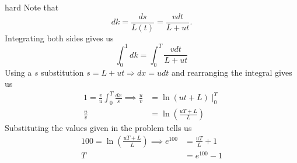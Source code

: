 \begin{solution}{hard}
Note that
\[dk = \frac {ds}{L(t)} = \frac {vdt}{L+ut}.\]
Integrating both sides gives us
\[\int_{0}^{1} dk = \int_{0}^{T} \frac {vdt}{L+ut}\] 
Using a $s$ substitution $s = L+ut \Rightarrow dx = udt$ and rearranging the integral gives us 
\begin{align*}
1 = \frac {v}{u} \int_{0}^{T} \frac {dx}{s} \implies \frac {u}{v} &= \ln(ut+L)\mid_{0}^{T}\\
\frac {u}{v} &= \ln\left(\frac {uT+L}{L}\right)
\end{align*}
Substituting the values given in the problem tells us 
\begin{align*}
100 = \ln\left(\frac {uT+L}{L}\right) \implies e^{100} &= \frac {uT}{L}+1 \\
 T &= \boxed{e^{100}-1}
\end{align*}
\end{solution}